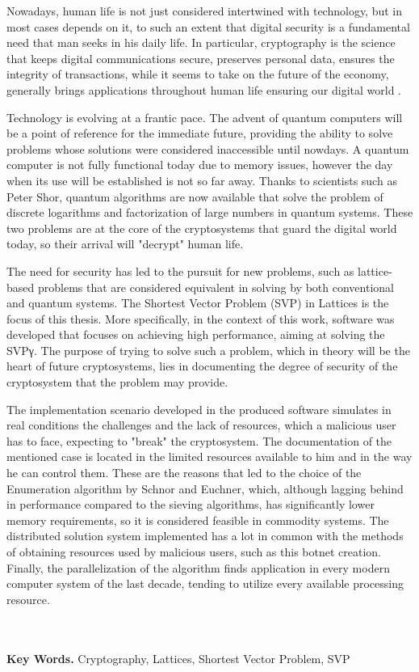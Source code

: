 {\latintext
\begin{center}
{}
\end{center}
{\small
	{\lt Nowadays, human life is not just considered intertwined with technology, but in most cases depends on it, to such an extent that digital security is a fundamental need that man seeks in his daily life. In particular, cryptography is the science that keeps digital communications secure, preserves personal data, ensures the integrity of transactions, while it seems to take on the future of the economy, generally brings applications throughout human life ensuring our digital world .

Technology is evolving at a frantic pace. The advent of quantum computers will be a point of reference for the immediate future, providing the ability to solve problems whose solutions were considered inaccessible until nowdays. A quantum computer is not fully functional today due to memory issues, however the day when its use will be established is not so far away. Thanks to scientists such as Peter Shor, quantum algorithms are now available that solve the problem of discrete logarithms and factorization of large numbers in quantum systems. These two problems are at the core of the cryptosystems that guard the digital world today, so their arrival will "decrypt" human life.

The need for security has led to the pursuit for new problems, such as lattice-based problems that are considered equivalent in solving by both conventional and quantum systems. The Shortest Vector Problem (SVP) in Lattices is the focus of this thesis. More specifically, in the context of this work, software was developed that focuses on achieving high performance, aiming at solving the SVPγ. The purpose of trying to solve such a problem, which in theory will be the heart of future cryptosystems, lies in documenting the degree of security of the cryptosystem that the problem may provide.

The implementation scenario developed in the produced software simulates in real conditions the challenges and the lack of resources, which a malicious user has to face, expecting to "break" the cryptosystem. The documentation of the mentioned case is located in the limited resources available to him and in the way he can control them. These are the reasons that led to the choice of the Enumeration algorithm by Schnor and Euchner, which, although lagging behind in performance compared to the sieving algorithms, has significantly lower memory requirements, so it is considered feasible in commodity systems. The distributed solution system implemented has a lot in common with the methods of obtaining resources used by malicious users, such as this botnet creation. Finally, the parallelization of the algorithm finds application in every modern computer system of the last decade, tending to utilize every available processing resource.}
	\ \\\\
{\bf Key Words.} Cryptography, Lattices, Shortest Vector Problem, SVP
}}

